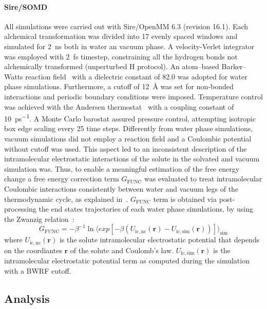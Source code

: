 \documentclass[journal=jctcce,manuscript=article]{achemso}
\begin{document}
\paragraph{Sire/SOMD} All simulations were carried out with
Sire/OpenMM 6.3 (revision 16.1).  Each alchemical transformation was
divided into 17 evenly spaced windows and simulated for \SI{2}{ns}
both in water an vacuum phase. A velocity-Verlet integrator was
employed with \SI{2}{fs} timestep, constraining all the hydrogen bonds
not alchemically transformed (unperturbed H protocol). An atom--based
Barker--Watts reaction field~\cite{doi:10.1080/00268977300102101} with
a dielectric constant of \num{82.0} was adopted for water phase
simulations. Furthermore, a cutoff of \SI{12}{\angstrom} was set for non-bonded
interactions and periodic boundary conditions were imposed.
Temperature control was achieved with the Andersen
thermostat~\cite{doi:10.1063/1.439486} with a coupling constant of
\SI{10}{ps^{-1}}.  A Monte Carlo barostat assured pressure control,
attempting isotropic box edge scaling every 25 time steps.
Differently from water phase simulations, vacuum simulations did not employ
a reaction field and a Coulombic potential without cutoff was used.
This aspect led to an inconsistent description of the intramolecular electrostatic interactions
of the solute in the solvated and vacuum simulation was.
Thus, to enable a meaningful estimation of the free energy change 
a free energy correction term $G_{\mathrm{FUNC}}$ was
evaluated to treat intramolecular Coulombic interactions consistently
between water and vacuum legs of the thermodynamic cycle, as explained
in~\cite{Bosisio2016}. $G_{\mathrm{FUNC}}$ term is obtained
via post-processing the end states trajectories of each water
phase simulations, by using the Zwanzig relation~\cite{zwanzig_high-temperature_1954}:
\begin{equation}
 \label{eq:ZwanzigDGfunc}
 G_{\mathrm{FUNC}} = -\beta^{-1} \ln \langle exp \left[-\beta(U_{\mathrm{ic,nc}}(\mathbf{r}) - U_{\mathrm{ic,sim}}(\mathbf{r}))\right]\rangle_{\mathrm{sim}}
\end{equation}
where $U_{\mathrm{ic,nc}}(\mathbf{r})$ is the solute intramolecular electrostatic 
potential that depends on the coordiantes $\mathbf{r}$ of the solute and Coulomb's law. 
$U_{\mathrm{ic,sim}}(\mathbf{r})$ is the intramolecular electrostatic potential term as
computed during the simulation with a BWRF cutoff. 


\subsection{Analysis}
\label{sec:analysis}
\end{document}
